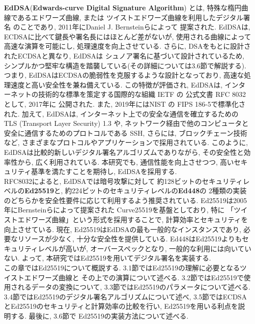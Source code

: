 \textbf{EdDSA}(\textbf{Edwards-curve Digital Signature Algorithm})
とは,  特殊な楕円曲線であるエドワーズ曲線, または
ツイストエドワーズ曲線\cite{twisted}を利用したデジタル署名
のことであり, 2011年にDaniel J. Bernsteinらによって
提案された\cite{high-speed}. 
EdDSAは, ECDSAに比べて鍵長や署名長にはほとんど差がないが, 
使用される曲線によって高速な演算を可能にし, 処理速度を向上させている. 
さらに, DSAをもとに設計されたECDSAと異なり, EdDSAは
シュノア署名\cite{schnorr}に基づいて設計されているため, 
シンプルかつ堅牢な構造を踏襲している(その詳細については3.6節で解説する). 
つまり, EdDSAはECDSAの脆弱性を克服するような設計となっており, 
高速な処理速度と高い安全性を兼ね備えている. この特徴が評価され, 
EdDSAは, インターネットの技術的な標準を策定する国際的な組織 IETF の
公式文書 RFC 8032 \cite{8032}として, 2017年に
公開された. また, 2019年にはNIST の FIPS 186-5で標準化された. 
加えて, EdDSAは, インターネット上での安全な通信を確立するための 
TLS (Transport Layer Security) 1.3 \cite{rfc8446}や, 
ネットワーク経由で他のコンピュータと安全に通信するためのプロトコルである 
SSH, さらには, ブロックチェーン技術\cite{monero}など, 
さまざまなプロトコルやアプリケーションで採用されている. 
このように, EdDSAは比較的新しいデジタル署名アルゴリズムでありながら, 
その安全性と効率性から, 広く利用されている. 
本研究でも, 通信性能を向上させつつ, 
高いセキュリティ基準を満たすことを期待し, EdDSAを採用する.\\
\indent RFC8032によると, EdDSAでは暗号攻撃に対して
約128ビットのセキュリティレベルの\textbf{Ed25519}と, 
約224ビットのセキュリティレベルの\textbf{Ed448}の
2種類の実装のどちらかを安全性要件に応じて利用するよう推奨されている. 
Ed25519は2005年にBernsteinらによって提案された
Curve25519\cite{curve25519}を基盤としており, 特に
「ツイストエドワーズ曲線」という形式を採用することで, 
計算効率とセキュリティを向上させている. 
現在, Ed25519はEdDSAの最も一般的なインスタンスであり, 
必要なリソースが少なく, 十分な安全性を提供している. 
Ed448はEd25519よりもセキュリティレベルが高いが, 
オーバースペックとなり, 一般的な利用には向いていない. 
よって, 本研究ではEd25519を用いてデジタル署名を実装する.\\
\indent この章ではEd25519について概説する. 
3.1節ではEd25519の理解に必要となるツイストエドワーズ曲線と
その上での演算について述べる. 
3.2節ではEd25519で使用されるデータの変換について, 
3.3節ではEd25519のパラメータについて述べる. 
3.4節ではEd25519のデジタル署名アルゴリズムについて述べ, 
3.5節ではECDSAとEd25519のセキュリティと計算効率の比較を行い, 
Ed25519を用いる利点を説明する. 最後に, 3.6節で
Ed25519の実装方法について述べる.\\
